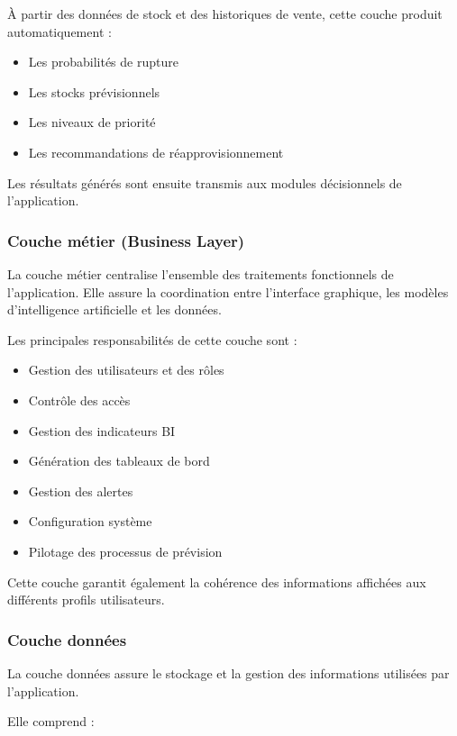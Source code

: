 À partir des données de stock et des historiques de vente, cette couche produit automatiquement :

\begin{itemize}
    \item Les probabilités de rupture 
    \item Les stocks prévisionnels 
    \item Les niveaux de priorité 
    \item Les recommandations de réapprovisionnement
\end{itemize}

Les résultats générés sont ensuite transmis aux modules décisionnels de l'application.

\subsubsection{Couche métier (Business Layer)}

La couche métier centralise l'ensemble des traitements fonctionnels de l'application. Elle assure la coordination entre l'interface graphique, les modèles d'intelligence artificielle et les données.

Les principales responsabilités de cette couche sont :

\begin{itemize}
    \item Gestion des utilisateurs et des rôles 
    \item Contrôle des accès 
    \item Gestion des indicateurs BI 
    \item Génération des tableaux de bord 
    \item Gestion des alertes 
    \item Configuration système 
    \item Pilotage des processus de prévision
\end{itemize}

Cette couche garantit également la cohérence des informations affichées aux différents profils utilisateurs.

\subsubsection{Couche données}

La couche données assure le stockage et la gestion des informations utilisées par l'application.

Elle comprend :

